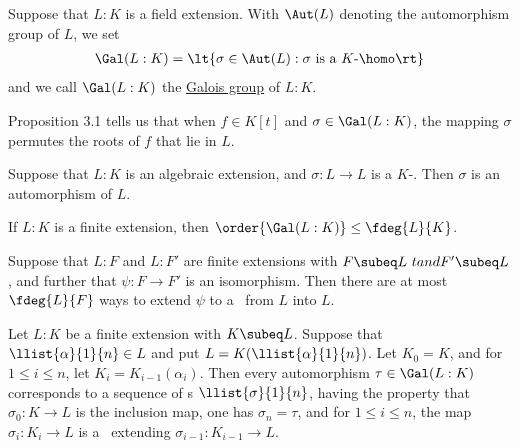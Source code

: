 \documentclass{article}
\begin{document}
  \begin{tdefinition}
    Suppose that \( L:K \) is a field extension.
    With \( \Aut(L) \) denoting the automorphism group of \( L \), we set \begin{align*}
      \Gal(L:K) = \lt\{ \sigma\in \Aut(L) : \sigma \text{ is a \( K \)-\homo} \rt\}
    \end{align*}
    and we call \( \Gal(L:K) \) the \ul{Galois group} of \( L:K \).
  \end{tdefinition}

  \quad Proposition 3.1 tells us that when \( f\in K[t] \) and \( \sigma\in \Gal(L:K) \), the mapping \( \sigma \) permutes the roots of \( f \) that lie in \( L \).

  \begin{ttheorem}
    Suppose that \( L:K \) is an algebraic extension, and \( \sigma:L\to L \) is a \( K \)-\homo.
    Then \( \sigma \) is an automorphism of \( L \).
  \end{ttheorem}

  \begin{ttheorem}
    If \( L:K \) is a finite extension, then \( \order{\Gal(L:K)}\leq \fdeg{L}{K} \).
  \end{ttheorem}

  \begin{tcorollary}
    Suppose that \( L:F \) and \( L:F' \) are finite extensions with \( F\subeq L\ tand F'\subeq L \), and further that \( \psi:F\to F' \) is an isomorphism.
    Then there are at most \( \fdeg{L}{F} \) ways to extend \( \psi \) to a \homo~from \( L \) into \( L \).
  \end{tcorollary}

  \begin{tcorollary}
    Let \( L:K \) be a finite extension with \( K\subeq L \).
    Suppose that \( \llist{\alpha}{1}{n}\in L \) and put \( L=K(\llist{\alpha}{1}{n}) \).
    Let \( K_0 = K \), and for \( 1\leq i\leq n \), let \( K_i = K_{i-1}(\alpha_i) \).
    Then every automorphism \( \tau \in \Gal(L:K) \) corresponds to a sequence of \homo s \( \llist{\sigma}{1}{n} \), having the property that \( \sigma_0:K\to L \) is the inclusion map, one has \( \sigma_n=\tau \), and for \( 1\leq i\leq n \), the map \( \sigma_i : K_i\to L \) is a \homo~extending \( \sigma_{i-1}:K_{i-1}\to L \).
  \end{tcorollary}
\end{document}
